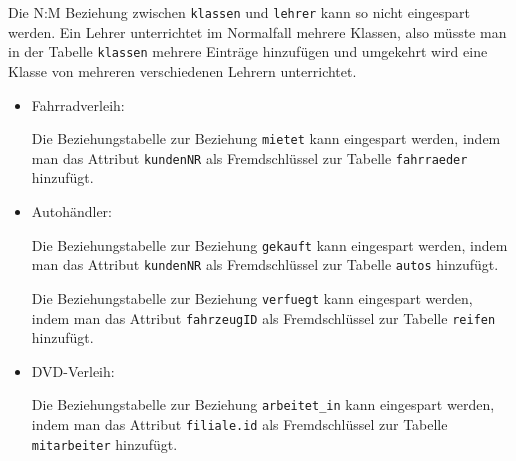 \medskip

Die N:M Beziehung zwischen \lstinline!klassen! und \lstinline!lehrer! kann so nicht eingespart werden. Ein Lehrer unterrichtet im Normalfall mehrere Klassen, also müsste man in der Tabelle \lstinline!klassen! mehrere Einträge hinzufügen und umgekehrt wird eine Klasse von mehreren verschiedenen Lehrern unterrichtet.
\begin{Exercise}[title={Überlege dir welche Beziehungstabellen man in Aufgabe \ref{ERMErstellen1} durch Optimierung einsparen kann und gib an, welches Attribut man an welchen Entitätstyp als Fremdschlüssel hinzufügen muss.}, label=Optimierung]
\end{Exercise}
\begin{Answer}[ref=Optimierung]
	\begin{itemize}
		\item Fahrradverleih:

		Die Beziehungstabelle zur Beziehung \lstinline!mietet! kann eingespart werden, indem man das Attribut \lstinline!kundenNR! als Fremdschlüssel zur Tabelle \lstinline!fahrraeder! hinzufügt.
		\item Autohändler:

		Die Beziehungstabelle zur Beziehung \lstinline!gekauft! kann eingespart werden, indem man das Attribut \lstinline!kundenNR! als Fremdschlüssel zur Tabelle \lstinline!autos! hinzufügt.

		Die Beziehungstabelle zur Beziehung \lstinline!verfuegt! kann eingespart werden, indem man das Attribut \lstinline!fahrzeugID! als Fremdschlüssel zur Tabelle \lstinline!reifen! hinzufügt.
		\item DVD-Verleih:

		Die Beziehungstabelle zur Beziehung \lstinline!arbeitet_in! kann eingespart werden, indem man das Attribut \lstinline!filiale.id! als Fremdschlüssel zur Tabelle \lstinline!mitarbeiter! hinzufügt.
	\end{itemize}
\end{Answer}